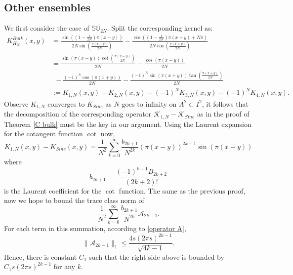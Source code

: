 \documentclass[11pt]{article}
\numberwithin{equation}{section}%
\numberwithin{theorem}{section}
\begin{document}
\subsection{Other ensembles}\label{other bulk}
\medbreak{}\enspace We first consider the case of $\mathbb{SO}_{2N}$. Split the corresponding kernel as:
\begin{equation*}
\begin{split}
K_{H_N}^{Bulk}(x,y)
&=\frac{\sin\left(\left(1-\frac{1}{2N}\right)\pi(x-y)\right)}{2N\sin\left(\frac{\pi(x-y)}{2N}\right)}-\frac{\cos\left(\left(1-\frac{1}{2N}\right)\pi(x+y)+N\pi\right)}{2N\cos\left(\frac{\pi(x+y)}{2N}\right)}\\
&=\frac{\sin\left(\pi(x-y)\right)\cot\left(\frac{\pi(x-y)}{2N}\right)}{2N}-\frac{\cos\left(\pi(x-y)\right)}{2N}\\&~~-\frac{(-1)^N\cos\left(\pi(x+y)\right)}{2N}-\frac{(-1)^N\sin\left(\pi(x+y)\right)\tan\left(\frac{\pi(x+y)}{2N}\right)}{2N}\\&:=K_{1,N}(x,y)-K_{2,N}(x,y)-(-1)^NK_{3,N}(x,y)-(-1)^NK_{4,N}(x,y).
\end{split}
\end{equation*}
Observe $K_{1,N}$ converges to $ K_{Sine}$ as $N$ goes to infinity on $A^2\subset I^2$, it follows that the decomposition of the corresponding operator $\mathcal{K}_{1,N}-\mathcal{K}_{Sine}$ as in the proof of Theorem \ref{C bulk} must be the key in our argument. Using the Laurent expansion for the cotangent function $\cot$ now,
\begin{equation*}
K_{1,N}(x,y)-K_{Sine}(x,y)=\frac{1}{N^2}\sum_{k=0}^\infty\frac{b_{2k+1}}{N^{2k}}(\pi(x-y))^{2k-1}\sin(\pi(x-y))
\end{equation*}
where
\begin{equation*}
    b_{2k+1}=\frac{(-1)^{k+1}B_{2k+2}}{(2k+2)!}
\end{equation*}
is the Laurent coefficient for the $\cot$ function. The same as the previous proof, now we hope to bound the trace class norm of
\begin{equation*}
\frac{1}{N^2}\sum_{k=0}^\infty\frac{b_{2k+1}}{N^{2k}}\mathcal{A}_{2k-1}.
\end{equation*}
 For each term in this summation, according to \eqref{operator A},
\begin{equation*}
    \|\mathcal{A}_{2k-1}\|_1\le\frac{4s(2\pi s)^{2k-1}}{\sqrt{4k-1}}.
\end{equation*}
Hence, there is constant $C_1$ such that the right side above is bounded by $C_1s(2\pi s)^{2k-1}$ for any $k$.
\end{document}
